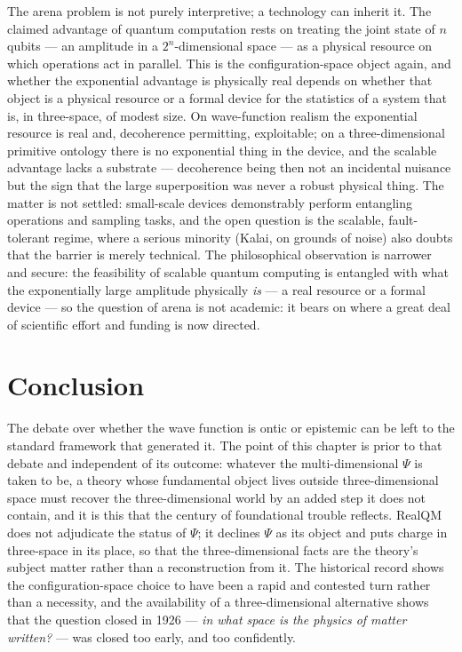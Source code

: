 The arena problem is not purely interpretive; a technology can inherit it. The claimed advantage of quantum
computation rests on treating the joint state of $n$ qubits --- an amplitude in a $2^n$-dimensional space --- as
a physical resource on which operations act in parallel. This is the configuration-space object again, and
whether the exponential advantage is physically real depends on whether that object is a physical resource or a
formal device for the statistics of a system that is, in three-space, of modest size. On wave-function realism the
exponential resource is real and, decoherence permitting, exploitable; on a three-dimensional primitive ontology
there is no exponential thing in the device, and the scalable advantage lacks a substrate --- decoherence being
then not an incidental nuisance but the sign that the large superposition was never a robust physical thing. The
matter is not settled: small-scale devices demonstrably perform entangling operations and sampling tasks, and the
open question is the scalable, fault-tolerant regime, where a serious minority (Kalai, on grounds of noise) also
doubts that the barrier is merely technical. The philosophical observation is narrower and secure: the feasibility
of scalable quantum computing is entangled with what the exponentially large amplitude physically \emph{is} --- a
real resource or a formal device --- so the question of arena is not academic: it bears on where a great deal of
scientific effort and funding is now directed.

\section{Conclusion}\label{sec:onto-conclusion}

The debate over whether the wave function is ontic or epistemic can be left to the standard framework that
generated it. The point of this chapter is prior to that debate and independent of its outcome: whatever the
multi-dimensional $\Psi$ is taken to be, a theory whose fundamental object lives outside three-dimensional space
must recover the three-dimensional world by an added step it does not contain, and it is this that the century of
foundational trouble reflects. RealQM does not adjudicate the status of $\Psi$; it declines $\Psi$ as its object
and puts charge in three-space in its place, so that the three-dimensional facts are the theory's subject matter
rather than a reconstruction from it. The historical record shows the configuration-space choice to have been a
rapid and contested turn rather than a necessity, and the availability of a three-dimensional alternative shows
that the question closed in 1926 --- \emph{in what space is the physics of matter written?} --- was closed too
early, and too confidently.
